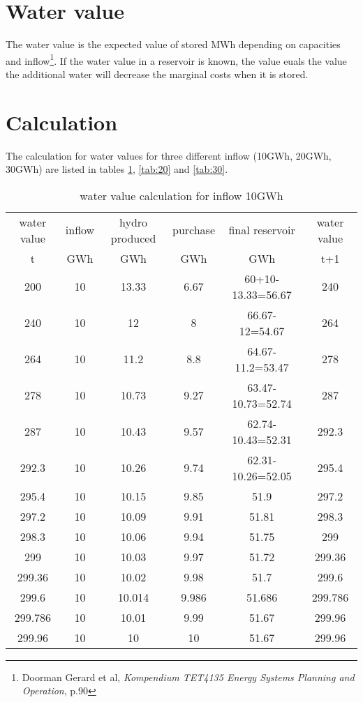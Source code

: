 \documentclass{article}
\begin{document}
\section{Water value}
The water value is the expected value of stored MWh depending on capacities and inflow\footnote{Doorman Gerard et al, \textit{Kompendium TET4135 Energy Systems Planning and Operation}, p.90}. If the water value in a reservoir is known, the value euals the value the additional water will decrease the marginal costs when it is stored.
\section{Calculation}
The calculation for water values for three different inflow (10GWh, 20GWh, 30GWh) are listed in tables \ref{tab:10}, \ref{tab:20} and \ref{tab:30}. 
\begin{table}
\begin{center}
\begin{tabular}{|c|c|c|c|c|c|}
\hline
water value & inflow & hydro produced & purchase & final reservoir	& water value\\
    t       &  GWh   &    GWh         &     GWh       &     GWh         & t+1 \\
\hline
\hline
200 & 10 & 13.33 & 6.67 & 60+10-13.33=56.67 & 240\\
240 & 10 & 12 & 8 & 66.67-12=54.67 & 264\\
264 & 10 & 11.2 & 8.8 & 64.67-11.2=53.47 & 278\\
278 & 10 & 10.73 & 9.27 & 63.47-10.73=52.74 & 287\\
287 & 10 & 10.43 & 9.57 & 62.74-10.43=52.31 & 292.3\\
292.3 & 10 & 10.26 & 9.74 & 62.31-10.26=52.05 & 295.4\\
295.4 & 10 & 10.15 & 9.85 & 51.9 & 297.2\\
297.2 & 10 & 10.09 & 9.91 & 51.81 & 298.3\\
298.3 & 10 & 10.06 & 9.94 & 51.75 & 299\\
299 & 10 & 10.03 & 9.97 & 51.72 & 299.36\\
299.36 & 10 & 10.02 & 9.98 & 51.7 & 299.6\\
299.6 & 10 & 10.014 & 9.986 & 51.686 & 299.786\\
299.786 & 10 & 10.01 & 9.99 & 51.67 & 299.96\\
\hline
299.96 & 10 & 10 & 10 & 51.67 & 299.96\\
\hline
\end{tabular}
\caption{water value calculation for inflow 10GWh}
\label{tab:10}
\end{center}
\end{table}
\end{document}
